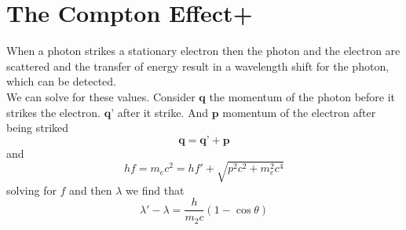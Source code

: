 \section{The Compton Effect+}
When a photon strikes a stationary electron then the photon and the electron are scattered and the transfer of energy result in a wavelength shift for the photon, which can be detected. 
\\
We can solve for these values. Consider $ \textbf{q} $ the momentum of the photon before it strikes the electron. $ \textbf{q'} $ after it strike. And $ \textbf{p} $ momentum of the electron after being striked
\[ \textbf{q} = \textbf{q'} + \textbf{p} \]
and
\[ hf = m_ec^2 = hf' + \sqrt{p^2c^2 + m_e^2c^4} \]
solving for $ f $ and then $ \lambda $ we find that 
\[ \lambda' - \lambda = \frac{h}{m_2c}(1- \cos \theta) \]































